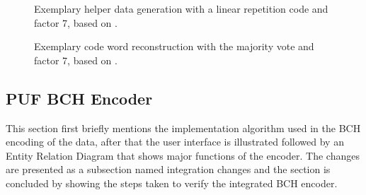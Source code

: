 \begin{figure}[h]
\centering
{}
\caption{Exemplary helper data generation with a linear repetition code and factor 7, based on \cite{10}.}
\label{img:4_LR_HD}
\end{figure}

\begin{figure}[h]
\centering
{}
\caption{Exemplary code word reconstruction with the majority vote and factor 7, based on \cite{10}.}
\label{img:4_MV_codewords}
\end{figure}

\subsection{PUF BCH Encoder}
This section first briefly mentions the implementation algorithm used in the BCH encoding of the data, after that the user interface is illustrated followed by an Entity Relation Diagram that shows major functions of the encoder. The changes are presented as a subsection named integration changes and the section is concluded by showing the steps taken to verify the integrated BCH encoder.\\

